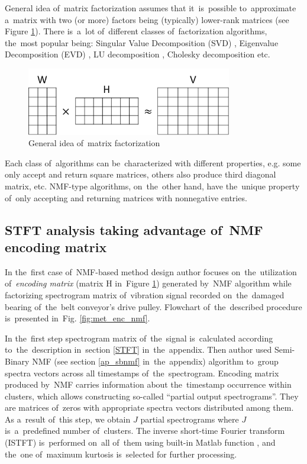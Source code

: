 General idea of~matrix factorization assumes that it~is~possible to~approximate a~matrix with two (or more) factors being (typically) lower-rank matrices (see Figure \ref{fig:met_nmf}). There is~a~lot of~different classes of~factorization algorithms, the~most popular being: Singular Value Decomposition (SVD) \cite{cempel2007multidimensional,cempel2008generalized}, Eigenvalue Decomposition (EVD) \cite{golub2012matrix,johnson1985matrix}, LU decomposition \cite{householder2013theory}, Cholesky decomposition \cite{golub2012matrix,johnson1985matrix} etc.

\begin{figure}[ht!]
\centering
\includegraphics[width=0.8\textwidth]{wykresy/met_nmf.png}
\caption{General idea of~matrix factorization}
\label{fig:met_nmf}
\end{figure}

Each class of~algorithms can be~characterized with different properties, e.g. some only accept and return square matrices, others also produce third diagonal matrix, etc. NMF-type algorithms, on~the~other hand, have the~unique property of~only accepting and returning matrices with nonnegative entries. 


\subsection{STFT analysis taking advantage of~NMF encoding matrix}\label{met_nmf_enc}

In the~first case of~NMF-based method design author focuses on~the~utilization of~\emph{encoding matrix} (matrix H in~Figure \ref{fig:met_nmf}) generated by~NMF algorithm while factorizing spectrogram matrix of~vibration signal recorded on~the~damaged bearing of~the~belt conveyor's drive pulley. Flowchart of~the~described procedure is~presented in~Fig. \ref{fig:met_enc_nmf}.

In the~first step spectrogram matrix of~the~signal is~calculated according to~the~description in~section \ref{STFT} in~the~appendix. Then author used Semi-Binary NMF (see section \ref{ap_sbnmf} in~the~appendix) algorithm to~group spectra vectors across all timestamps of~the~spectrogram. Encoding matrix produced by~NMF carries information about the~timestamp occurrence within clusters, which allows constructing so-called “partial output spectrograms”. They are matrices of~zeros with appropriate spectra vectors distributed among them. As a~result of~this step, we obtain $J$ partial spectrograms where $J$ is~a~predefined number of~clusters. The inverse short-time Fourier transform (ISTFT) is~performed on~all of~them using built-in Matlab function  \cite{benesty2007springer}, and the~one of~maximum kurtosis is~selected for further processing.

